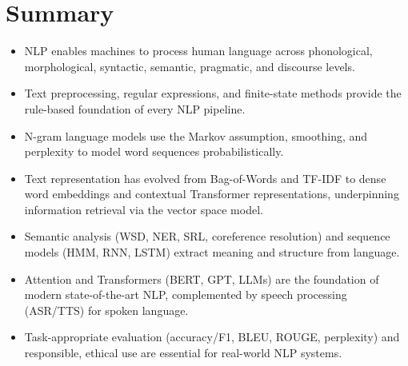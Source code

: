 \documentclass[11pt,a4paper]{article}
\begin{document}
\section{Summary}

\begin{examplebox}
\begin{itemize}[leftmargin=*]
  \item NLP enables machines to process human language across phonological, morphological, syntactic, semantic, pragmatic, and discourse levels.
  \item Text preprocessing, regular expressions, and finite-state methods provide the rule-based foundation of every NLP pipeline.
  \item N-gram language models use the Markov assumption, smoothing, and perplexity to model word sequences probabilistically.
  \item Text representation has evolved from Bag-of-Words and TF-IDF to dense word embeddings and contextual Transformer representations, underpinning information retrieval via the vector space model.
  \item Semantic analysis (WSD, NER, SRL, coreference resolution) and sequence models (HMM, RNN, LSTM) extract meaning and structure from language.
  \item Attention and Transformers (BERT, GPT, LLMs) are the foundation of modern state-of-the-art NLP, complemented by speech processing (ASR/TTS) for spoken language.
  \item Task-appropriate evaluation (accuracy/F1, BLEU, ROUGE, perplexity) and responsible, ethical use are essential for real-world NLP systems.
\end{itemize}
\end{examplebox}
\end{document}
